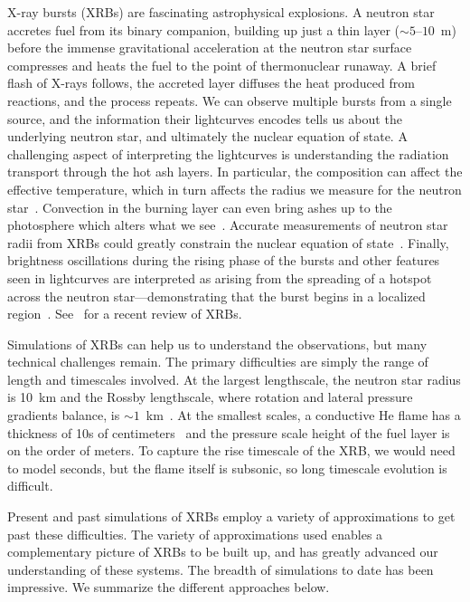 \documentclass[a4paper]{jpconf}
\begin{document}
X-ray bursts (XRBs) are fascinating astrophysical explosions.  A
neutron star accretes fuel from its binary companion, building up just
a thin layer ($\sim 5$--$10$~m) before the immense gravitational
acceleration at the neutron star surface compresses and heats the fuel
to the point of thermonuclear runaway.  A brief flash of X-rays
follows, the accreted layer diffuses the heat produced from reactions,
and the process repeats.  We can observe multiple bursts from a single
source, and the information their lightcurves encodes tells us about
the underlying neutron star, and ultimately the nuclear equation of
state.  A challenging aspect of interpreting the lightcurves is
understanding the radiation transport through the hot ash layers.  In
particular, the composition can affect the effective temperature,
which in turn affects the radius we measure for the neutron
star~\cite{suleimanov:2011}.  Convection in the burning layer can even
bring ashes up to the photosphere which alters what we
see~\cite{kajava:2017}.  Accurate measurements of neutron star radii
from XRBs could greatly constrain the nuclear equation of
state~\cite{steiner:2010,ozel:2010}.  Finally, brightness oscillations
during the rising phase of the bursts
and other features seen in lightcurves are interpreted as arising from
the spreading of a hotspot across the neutron star---demonstrating
that the burst begins in a localized
region~\cite{bhattacharyya:2006,bhattacharyya:2007}.
See~\cite{galloway:2017} for a recent review of XRBs.

Simulations of XRBs can help us to understand the observations, but
many technical challenges remain.  The primary difficulties are simply
the range of length and timescales involved.  At the largest lengthscale,
the neutron star radius is 10~km and the Rossby lengthscale, where rotation
and lateral pressure gradients balance, is $\sim
1$~km~\cite{SPIT_ETAL02}.  At the smallest scales, a conductive He
flame has a thickness of 10s of centimeters~\cite{Timmes00} and the
pressure scale height of the fuel layer is on the order of meters.  To capture the
rise timescale of the XRB, we would need to model seconds, but the flame itself
is subsonic, so long timescale evolution is difficult.

Present and past simulations of XRBs employ a variety of
approximations to get past these difficulties.  The variety of
approximations used enables a complementary picture of XRBs to be built up,
and has greatly advanced our understanding of these systems.
The breadth of simulations to date has been impressive.  We summarize
the different approaches below.
\end{document}
